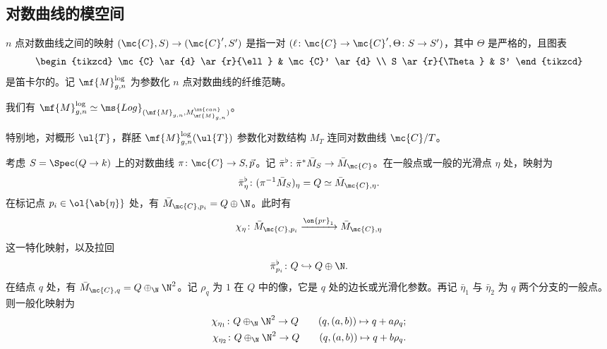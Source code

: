 \subsection{对数曲线的模空间}%
\label{sub:Moduli of log curves}

\begin{defn}
    \(n\) 点对数曲线之间的映射 \((\mc{C}, S) \to (\mc{C}', S')\) 是指一对 \((\ell \colon \mc{C} \to \mc{C}', \Theta \colon S \to S')\)，其中 \(\Theta\) 是严格的，且图表
    \begin{equation*}
    \begin{tikzcd}
        \mc{C} \ar{d} \ar{r}{\ell} & \mc{C}' \ar{d} \\
        S \ar{r}{\Theta} & S'
    \end{tikzcd}
    \end{equation*}
    是笛卡尔的。记 \(\mf{M}_{g,n}^{\log}\) 为参数化 \(n\) 点对数曲线的纤维范畴。
\end{defn}

\begin{prop}
    我们有 \(\mf{M}_{g,n}^{\log} \simeq \ms{Log}_{(\mf{M}_{g,n}, M_{\mf{M}_{g,n}}^{\on{can}})}\)。
\end{prop}

特别地，对概形 \(\ul{T}\)，群胚 \(\mf{M}_{g,n}^{\log}(\ul{T})\) 参数化对数结构 \(M_T\) 连同对数曲线 \(\mc{C} / T\)。

考虑 \(S = \Spec (Q \to k)\) 上的对数曲线 \(\pi \colon \mc{C} \to S, \vec{p}\)。记 \(\bar{\pi}^{\flat} \colon \bar{\pi}^* \bar{M}_S \to \bar{M}_{\mc{C}}\)。在一般点或一般的光滑点 \(\eta\) 处，映射为
\[ \bar{\pi}_{\eta}^{\flat} \colon (\pi^{-1} \bar{M}_S)_{\eta} = Q \simeq \bar{M}_{\mc{C}, \eta}. \]
在标记点 \(p_i \in \ol{\ab\{\eta\}}\) 处，有 \(\bar{M}_{\mc{C}, p_i} = Q \oplus \N\)。此时有
\[ \chi_{\eta} \colon \bar{M}_{\mc{C}, p_i} \xrightarrow{\on{pr}_1} \bar{M}_{\mc{C}, \eta} \]
这一特化映射，以及拉回
\[ \bar{\pi}_{p_i}^{\flat} \colon Q \hookrightarrow Q \oplus \N. \]
在结点 \(q\) 处，有 \(\bar{M}_{\mc{C}, q} = Q \oplus_{\N} \N^2\)。记 \(\rho_q\) 为 \(1\) 在 \(Q\) 中的像，它是 \(q\) 处的边长或光滑化参数。再记 \(\bar{\eta}_1\) 与 \(\bar{\eta}_2\) 为 \(q\) 两个分支的一般点。则一般化映射为
\begin{align*}
    \chi_{\eta_1} \colon Q \oplus_{\N} \N^2 \to Q \qquad (q, (a,b)) \mapsto q + a \rho_q ;\\
    \chi_{\eta_2} \colon Q \oplus_{\N} \N^2 \to Q \qquad (q, (a,b)) \mapsto q + b \rho_q .
\end{align*}

